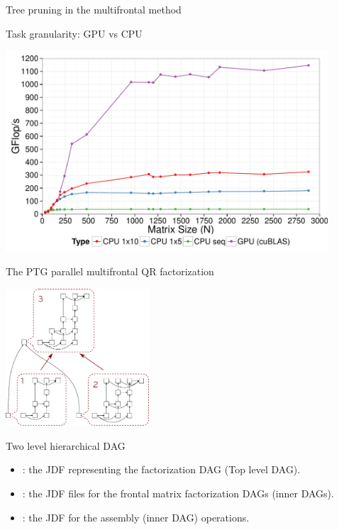 \begin{frame}{Tree pruning in the multifrontal method}
\end{frame}

\begin{frame}{Task granularity: GPU vs CPU}
  \centering
   
  \includegraphics[width=0.9\textwidth]{figures/cholesky_GEMM_evaluation_nolog}

\end{frame}

\begin{frame}{The PTG parallel multifrontal QR factorization}
  \centering
   
  \includegraphics[width=0.4\textwidth]{figures/dag_parsec}

  Two level hierarchical DAG
  \begin{itemize}
  \item {}: the JDF representing the
    factorization DAG (Top level DAG).
  \item {}: the JDF files for the
    frontal matrix factorization DAGs (inner DAGs).
  \item {}: the JDF for the assembly (inner DAG)
    operations.
  \end{itemize}

\end{frame}

